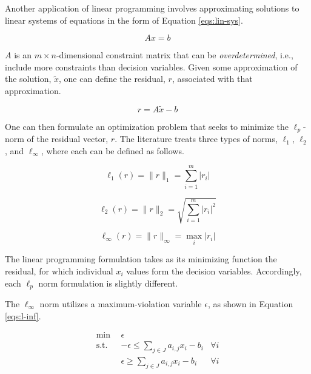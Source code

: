 Another application of linear programming involves approximating solutions to
linear systems of equations in the form of Equation \ref{eqs:lin-sys}.

\begin{equation}\label{eqs:lin-sys}
A x = b
\end{equation}

$A$ is an $m \times n$-dimensional constraint matrix that can
be \textit{overdetermined}, i.e., include more constraints than decision
variables. Given some approximation of the solution, $\tilde{x}$, one can define
the residual, $r$, associated with that approximation.

\begin{equation}\label{eqs:lin-sys-approx}
r = A \tilde{x} - b
\end{equation}

One can then formulate an optimization problem that seeks to minimize the
$\ell_p$-norm of the residual vector, $r$. The literature treats three types of
norms, $\ell_1$, $\ell_2$, and $\ell_\infty$, where each can be defined as
follows.

\begin{equation}
\ell_1 (r) = \| r \|_1 = \sum_{i = 1}^{m} | r_i |
\end{equation}

\begin{equation}
\ell_2 (r) = \| r \|_2 = \sqrt{ \sum_{i = 1}^{m} | r_i |^2 }
\end{equation}

\begin{equation}
\ell_\infty (r) = \| r \|_\infty = \max_{i} | r_i |
\end{equation}

The linear programming formulation takes as its minimizing function the
residual, for which individual $x_i$ values form the decision
variables. Accordingly, each $\ell_p$ norm formulation is slightly
different. 

The $\ell_\infty$ norm utilizes a maximum-violation variable $\epsilon$, as shown
in Equation \ref{eqs:l-inf}.

\begin{subequations}\label{eqs:l-inf}
  \begin{align}
    \min \:\: & 
    \epsilon  \\
    \text{s.t.} \:\: &
    - \epsilon \leq \sum_{j \in J} a_{i,j} x_i - b_i
    & \forall i \\
    &
    \epsilon \geq \sum_{j \in J} a_{i,j} x_i - b_i
    & \forall i \\
  \end{align}
\end{subequations}

